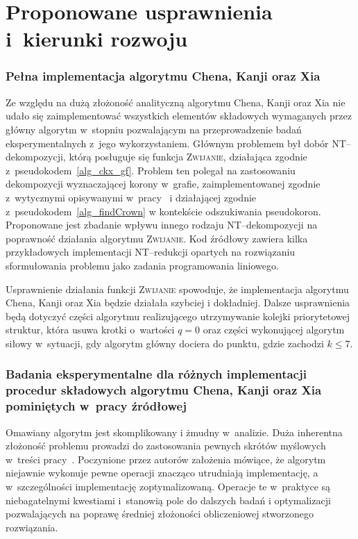 \section*{Proponowane usprawnienia i~kierunki rozwoju}\label{s_improvements}
\addtocounter{section}{1}
  \subsubsection{\textbf{Pełna implementacja algorytmu Chena, Kanji oraz Xia}}\label{sss_problems_ckx}

  Ze względu na dużą złożoność analityczną algorytmu Chena, Kanji oraz Xia nie udało się zaimplementować wszystkich elementów składowych wymaganych przez główny algorytm w~stopniu pozwalającym na przeprowadzenie badań eksperymentalnych z~jego wykorzystaniem.
  Głównym problemem był dobór NT--dekompozycji, którą posługuje się funkcja \textsc{Zwijanie}, działająca zgodnie z~pseudokodem~\ref{alg_ckx_gf}.
  Problem ten polegał na zastosowaniu dekompozycji wyznaczającej korony w~grafie, zaimplementowanej zgodnie z~wytycznymi opisywanymi w~pracy~\cite{KernelizationAlgorithms04} i działającej zgodnie z~pseudokodem~\ref{alg_findCrown} w kontekście odszukiwania pseudokoron.
  Proponowane jest zbadanie wpływu innego rodzaju NT--dekompozycji na poprawność działania algorytmu \textsc{Zwijanie}.
  Kod źródłowy zawiera kilka przykładowych implementacji NT--redukcji opartych na rozwiązaniu sformułowania problemu jako zadania programowania liniowego.

  Usprawnienie działania funkcji \textsc{Zwijanie} spowoduje, że implementacja algorytmu Chena, Kanji oraz Xia będzie działała szybciej i dokładniej.
  Dalsze usprawnienia będą dotyczyć części algorytmu realizującego utrzymywanie kolejki priorytetowej struktur, która usuwa krotki o~wartości $q = 0$ oraz części wykonującej algorytm siłowy w~sytuacji, gdy algorytm główny dociera do punktu, gdzie zachodzi $k \leq 7$.

  \subsubsection{\textbf{Badania eksperymentalne dla różnych implementacji procedur składowych algorytmu Chena, Kanji oraz Xia pominiętych w~pracy źródłowej}}

  Omawiany algorytm jest skomplikowany i żmudny w~analizie.
  Duża inherentna złożoność problemu prowadzi do zastosowania pewnych skrótów myślowych w~treści pracy~\cite{ImprovedBounds10}.
  Poczynione przez autorów założenia mówiące, że algorytm niejawnie wykonuje pewne operacji znacząco utrudniają implementację, a w~szczególności implementację zoptymalizowaną.
  Operacje te w~praktyce są niebagatelnymi kwestiami i~stanowią pole do dalszych badań i optymalizacji pozwalających na poprawę średniej złożoności obliczeniowej stworzonego rozwiązania.

